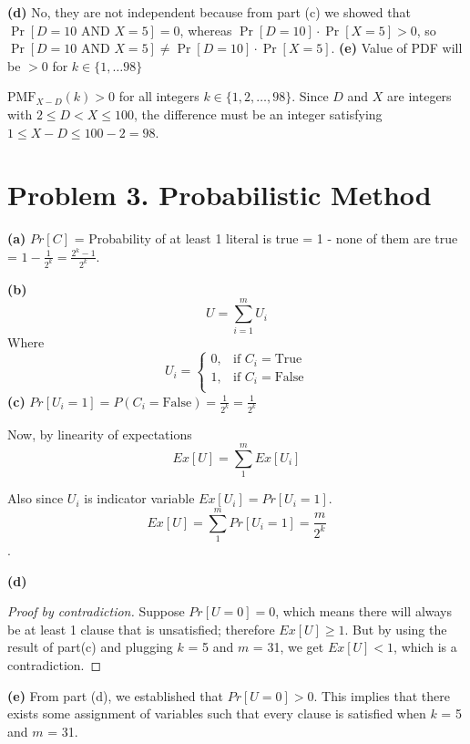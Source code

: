 \documentclass{article}
\begin{document}
\vspace{\baselineskip}
\noindent\textbf{(d)}
No, they are not independent because from part (c) we showed that $\Pr[D = 10 \text{ AND } X = 5] = 0$, 
whereas $\Pr[D = 10] \cdot \Pr[X = 5] > 0$, so $\Pr[D = 10 \text{ AND } X = 5] \neq \Pr[D = 10] \cdot \Pr[X = 5]$.
\vspace{\baselineskip}
\noindent\textbf{(e)}
Value of PDF will be $> 0$ for $k \in \{1,\dots 98\}$

$\text{PMF}_{X-D}(k) > 0$ for all integers $k \in \{1, 2, \dots, 98\}$. 
Since $D$ and $X$ are integers with $2 \le D < X \le 100$, the difference must be an integer satisfying $1 \le X - D \le 100 - 2 = 98$.

\section*{Problem 3. Probabilistic Method}

\textbf{(a)} $Pr[C]$ = Probability of at least 1 literal is true = 1 - none of them are true = $1 - \frac{1}{2^k} = \frac{2^k - 1}{2^k}$.

\vspace{\baselineskip}
\noindent\textbf{(b)}
\[
U = \sum_{i=1}^{m} U_i
\]
Where
\[
U_i = \begin{cases}
0, & \text{if } C_i = \text{True} \\
1, & \text{if } C_i = \text{False} \\
\end{cases}
\]
\vspace{\baselineskip}
\noindent\textbf{(c)}
$Pr[U_i = 1] = P(C_i=\text{False})=\frac{1}{2^k} = \frac{1}{2^k}$

Now, by linearity of expectations
\[Ex[U] = \sum_{1}^{m}Ex[U_i]\]

Also since $U_i$ is indicator variable $Ex[U_i] = Pr[U_i = 1]$.
\[Ex[U] = \sum_{1}^{m}Pr[U_i = 1] = \frac{m}{2^k}\].

\pagebreak

\vspace{\baselineskip}
\noindent\textbf{(d)}
\begin{proof}[Proof by contradiction]
Suppose $Pr[U = 0] = 0$, which means there will always be at least 1 clause that is unsatisfied; therefore $Ex[U] \geq 1$.
But by using the result of part(c) and plugging $k$ = 5 and $m$ = 31, we get $Ex[U] < 1$, which is a contradiction.
\end{proof}

\vspace{\baselineskip}
\noindent\textbf{(e)}
From part (d), we established that $Pr[U = 0] > 0$. This implies that there exists some assignment of variables such that every clause is satisfied
when $k$ = 5 and $m$ = 31.
\end{document}
